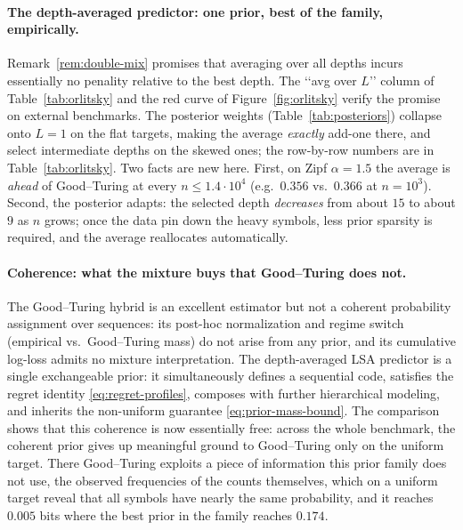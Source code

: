 \documentclass[11pt]{article}
\begin{document}
\paragraph{The depth-averaged predictor: one prior, best of the family,
empirically.}
Remark~\ref{rem:double-mix} promises that averaging over all depths incurs essentially no penality relative to the best depth. The ‘‘avg over \(L\)’’
column of Table~\ref{tab:orlitsky} and the red curve of
Figure~\ref{fig:orlitsky} verify the promise on external benchmarks. The
posterior weights (Table~\ref{tab:posteriors}) collapse onto \(L=1\) on
the flat targets, making the average \emph{exactly} add-one there, and
select intermediate depths on the skewed ones; the row-by-row numbers are
in Table~\ref{tab:orlitsky}. Two facts are new here. First, on Zipf
\(\alpha=1.5\) the average is \emph{ahead} of Good--Turing at every
\(n\le1.4\cdot10^4\) (e.g.\ \(0.356\) vs.\ \(0.366\) at \(n=10^3\)).
Second, the posterior adapts: the selected depth \emph{decreases} from
about \(15\) to about \(9\) as \(n\) grows; once the data pin down the
heavy symbols, less prior sparsity is required, and the average
reallocates automatically.

\paragraph{Coherence: what the mixture buys that Good--Turing does not.}
The Good--Turing hybrid is an excellent estimator but not a coherent
probability assignment over sequences: its post-hoc normalization and
regime switch (empirical vs.\ Good--Turing mass) do not arise from any prior,
and its cumulative log-loss admits no mixture interpretation.  The
depth-averaged LSA predictor is a single exchangeable prior: it
simultaneously defines a sequential code, satisfies the regret identity
\eqref{eq:regret-profiles}, composes with further hierarchical modeling,
and inherits the non-uniform guarantee \eqref{eq:prior-mass-bound}.  The
comparison shows that this coherence is now essentially free: across the
whole benchmark, the coherent prior gives up meaningful ground to
Good--Turing only on the uniform target.  There Good--Turing exploits a
piece of information this prior family does not use, the observed
frequencies of the counts themselves, which on a uniform target reveal
that all symbols have nearly the same probability, and it reaches
\(0.005\) bits where the best prior in the family reaches \(0.174\).
\end{document}
